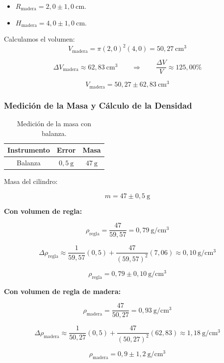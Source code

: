 \begin{itemize}
    \item $R_{\text{madera}} = 2{,}0 \pm 1{,}0\ \text{cm}$.
    \item $H_{\text{madera}} = 4{,}0 \pm 1{,}0\ \text{cm}$.
\end{itemize}

Calculamos el volumen:
\[
V_{\text{madera}} = \pi (2{,}0)^2 (4{,}0) = 50{,}27\ \text{cm}^3
\]

\[
\Delta V_{\text{madera}} \approx 62{,}83\ \text{cm}^3
\qquad \Rightarrow \qquad
\frac{\Delta V}{V} \approx 125{,}00\%
\]

\[
V_{\text{madera}} = 50{,}27 \pm 62{,}83\ \text{cm}^3
\]



\subsubsection{Medición de la Masa y Cálculo de la Densidad}

\begin{table}[h!]
\centering
\begin{tabular}{|c|c|c|}
\hline
\textbf{Instrumento} & \textbf{Error} & \textbf{Masa} \\ \hline
Balanza & $0{,}5\ \mathrm{g}$ & $47\ \mathrm{g}$ \\ \hline
\end{tabular}
\caption{Medición de la masa con balanza.}
\end{table}

Masa del cilindro:

\[
m = 47 \pm 0{,}5\ \mathrm{g}
\]

\textbf{Con volumen de regla:}

\[
\rho_{\text{regla}} = \frac{47}{59{,}57} = 0{,}79\ \mathrm{g/cm^3}
\]

\[
\Delta \rho_{\text{regla}} \approx \frac{1}{59{,}57}(0{,}5) + \frac{47}{(59{,}57)^2}(7{,}06) \approx 0{,}10\ \mathrm{g/cm^3}
\]

\[
\rho_{\text{regla}} = 0{,}79 \pm 0{,}10\ \mathrm{g/cm^3}
\]

\textbf{Con volumen de regla de madera:}

\[
\rho_{\text{madera}} = \frac{47}{50{,}27} = 0{,}93\ \mathrm{g/cm^3}
\]

\[
\Delta \rho_{\text{madera}} \approx \frac{1}{50{,}27}(0{,}5) + \frac{47}{(50{,}27)^2}(62{,}83) \approx 1{,}18\ \mathrm{g/cm^3}
\]

\[
\rho_{\text{madera}} = 0{,}9 \pm 1{,}2\ \mathrm{g/cm^3}
\]

